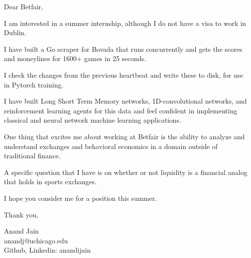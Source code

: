 \documentclass[10pt,a4paper]{letter} %
\begin{document}
Dear Betfair,

I am interested in a summer internship, although I do not have a visa to work in Dublin.

I have built a Go scraper for Bovada that runs concurrently and gets the scores and moneylines for 1600+ games in 25 seconds.

I check the changes from the previous heartbeat and write these to disk, for use in Pytorch training.

I have built Long Short Term Memory networks, 1D-convolutional networks, and reinforcement learning agents for this data and feel confident in implementing classical and neural network machine learning applications.

One thing that excites me about working at Betfair is the ability to analyze and understand exchanges and behavioral economics in a domain outside of traditional finance.

A specific question that I have is on whether or not liquidity is a financial analog that holds in sports exchanges. 

I hope you consider me for a position this summer.

Thank you, 

Anand Jain\\
anandj@uchicago.edu\\
Github, Linkedin: anandijain
\end{document}

